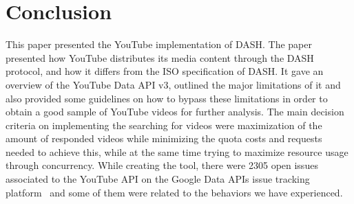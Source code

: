 \section{Conclusion}
This paper presented the YouTube implementation of DASH. The paper presented how
YouTube distributes its media content through the DASH protocol, and how it
differs from the ISO specification of DASH. It gave an overview of the YouTube
Data API v3, outlined the major limitations of it and also provided some
guidelines on how to bypass these limitations in order to obtain a good sample
of YouTube videos for further analysis. The main decision criteria on
implementing the searching for videos were maximization of the amount of
responded videos while minimizing the quota costs and requests needed to achieve
this, while at the same time trying to maximize resource usage through
concurrency. While creating the tool, there were 2305 open issues associated to
the YouTube API on the Google Data APIs issue tracking
platform~\cite{conclusion:gdataissue} and some of them were related to the
behaviors we have experienced.
